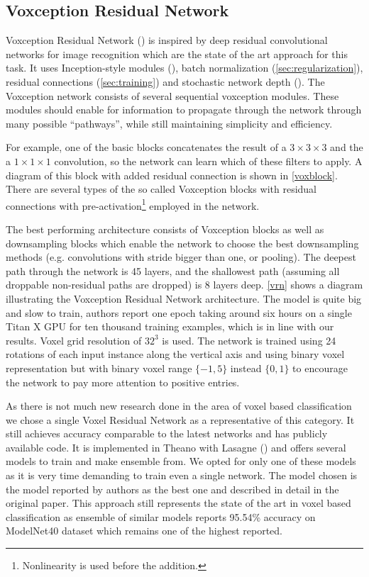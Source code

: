 \subsection{Voxception Residual Network}
Voxception Residual Network (\cite{brock_generative_2016}) is inspired by deep residual convolutional networks for image recognition which are the state of the art approach for this task. It uses Inception-style modules (\cite{szegedy_inception-v4_2016}), batch normalization (\autoref{sec:regularization}), residual connections (\autoref{sec:training}) and stochastic network depth (\cite{huang_deep_2016}). The Voxception network consists of several sequential voxception modules. These modules  should enable for information to propagate through the network through many possible “pathways”, while still maintaining simplicity and efficiency. \par
For example, one of the basic blocks concatenates the result of a $3\times3\times3$ and the a $1\times1\times1$ convolution, so the network can learn which of these filters to apply. A diagram of this block with added residual connection is shown in \autoref{voxblock}. There are several types of the so called Voxception blocks with residual connections with pre-activation\footnote{Nonlinearity is used before the addition.} employed in the network. \par
The best performing architecture consists of Voxception blocks as well as downsampling blocks which enable the network to choose the best downsampling methods (e.g. convolutions with stride bigger than one, or pooling). The deepest path through the network is 45 layers, and the shallowest path (assuming all droppable non-residual paths are dropped) is 8 layers deep. \autoref{vrn} shows a diagram illustrating the Voxception Residual Network architecture.
The model is quite big and slow to train, authors report one epoch taking around six hours on a single Titan X GPU for ten thousand training examples, which is in line with our results. 
Voxel grid resolution of $32^3$ is used. The network is trained using 24 rotations of each input instance along the vertical axis and using binary voxel representation but with binary voxel range $\{-1,5\}$ instead $\{0,1\}$  to encourage the network to pay more attention to positive entries. \par
As there is not much new research done in the area of voxel based classification we chose a single Voxel Residual Network as a representative of this category. It still achieves accuracy comparable to the latest networks and has publicly available code. It is implemented in Theano with Lasagne (\cite{brock_vrn_2016}) and offers several models to train and make ensemble from. We opted for only one of these models as it is very time demanding to train even a single network. The model chosen is the model reported by authors as the best one and described in detail in the original paper. 
This approach still represents the state of the art in voxel based classification as ensemble of similar models reports 95.54\% accuracy on ModelNet40 dataset which remains one of the highest reported.

